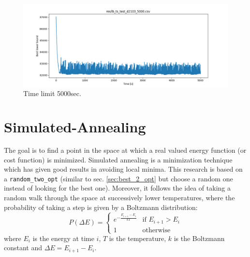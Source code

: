 \begin{figure}[!h]
	\centering
	\includegraphics[width=.70\columnwidth]{../res/lb_tabu_search_n_greedy_d2103.png}
	\caption{Time limit 5000sec.}
	\label{fig:tabu_search_perform_time_5000}
\end{figure}
\section{Simulated-Annealing}
The goal is to find a point in the space at which a real valued energy function (or cost function) is minimized. Simulated annealing is a minimization technique which has given good results in avoiding local minima. This research is based on a \texttt{random\_two\_opt} (similar to sec. \ref{sec:best_2_opt} but choose a random one instead of looking for the best one). Moreover, it follows the idea of taking a random walk through the space at successively lower temperatures, where the probability of taking a step is given by a Boltzmann distribution:
\begin{equation}
	P(\Delta E)= \begin{cases} 
	e^{-\frac{ E_{i+1} - E_{i}}{kT}} & \text{if } E_{i+1} > E_{i} \\
	1 & \text{otherwise}
	\end{cases}
\end{equation}
where $ E_{i} $ is the energy at time $ i $, $ T $ is the temperature, $k$ is the Boltzmann constant and $\Delta E =  E_{i+1} - E_{i}$. \\
